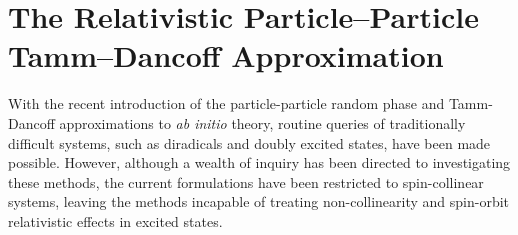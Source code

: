 \linespread{1.0}
\section{The Relativistic Particle--Particle Tamm--Dancoff Approximation}
\linespread{1.5}
\label{sec:pp-X2C}

With the recent introduction of the particle-particle random phase and
Tamm-Dancoff approximations to \emph{ab initio} theory, routine queries of
traditionally difficult systems, such as diradicals and doubly excited states,
have been made possible. However, although a wealth of inquiry has been directed
to investigating these methods, the current formulations have been restricted to
spin-collinear systems, leaving the methods incapable of treating
non-collinearity and spin-orbit relativistic effects in excited states.
